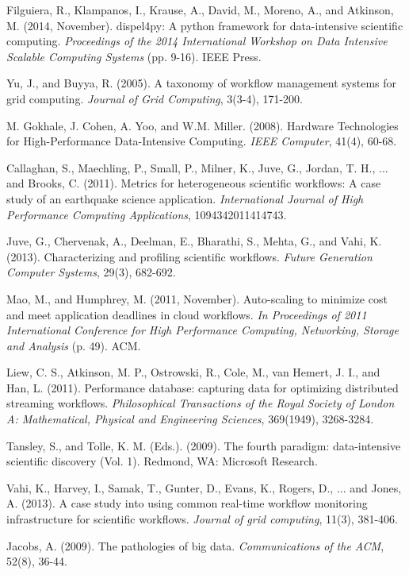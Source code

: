 \documentclass[10pt,twoside,openright,logo]{report}
\begin{document}

\begin{thebibliography}{99} %

Filguiera, R., Klampanos, I., Krause, A., David, M., Moreno, A., and Atkinson, M. (2014, November).
\newblock dispel4py: A python framework for data-intensive scientific computing.
\newblock \emph{Proceedings of the 2014 International Workshop on Data Intensive Scalable Computing Systems} (pp. 9-16). IEEE Press.

Yu, J., and Buyya, R. (2005).
\newblock A taxonomy of workflow management systems for grid computing.
\newblock \emph{Journal of Grid Computing}, 3(3-4), 171-200.

M. Gokhale, J. Cohen, A. Yoo, and W.M. Miller. (2008).
\newblock Hardware Technologies for High-Performance Data-Intensive Computing.
\newblock \emph{IEEE Computer}, 41(4), 60-68.

Callaghan, S., Maechling, P., Small, P., Milner, K., Juve, G., Jordan, T. H., ... and Brooks, C. (2011).
\newblock Metrics for heterogeneous scientific workflows: A case study of an earthquake science application.
\newblock \emph{International Journal of High Performance Computing Applications}, 1094342011414743.

Juve, G., Chervenak, A., Deelman, E., Bharathi, S., Mehta, G., and Vahi, K. (2013).
\newblock Characterizing and profiling scientific workflows.
\newblock \emph{Future Generation Computer Systems}, 29(3), 682-692.

Mao, M., and Humphrey, M. (2011, November).
\newblock Auto-scaling to minimize cost and meet application deadlines in cloud workflows.
\newblock \emph{In Proceedings of 2011 International Conference for High Performance Computing, Networking, Storage and Analysis} (p. 49). ACM.

Liew, C. S., Atkinson, M. P., Ostrowski, R., Cole, M., van Hemert, J. I., and Han, L. (2011).
\newblock Performance database: capturing data for optimizing distributed streaming workflows.
\newblock \emph{Philosophical Transactions of the Royal Society of London A: Mathematical, Physical and Engineering Sciences}, 369(1949), 3268-3284.

Tansley, S., and Tolle, K. M. (Eds.). (2009).
\newblock The fourth paradigm: data-intensive scientific discovery (Vol. 1).
\newblock Redmond, WA: Microsoft Research.

Vahi, K., Harvey, I., Samak, T., Gunter, D., Evans, K., Rogers, D., ... and Jones, A. (2013).
\newblock A case study into using common real-time workflow monitoring infrastructure for scientific workflows.
\newblock \emph{Journal of grid computing}, 11(3), 381-406.

Jacobs, A. (2009).
\newblock The pathologies of big data.
\newblock \emph{Communications of the ACM}, 52(8), 36-44.
\end{thebibliography}

\end{document}
